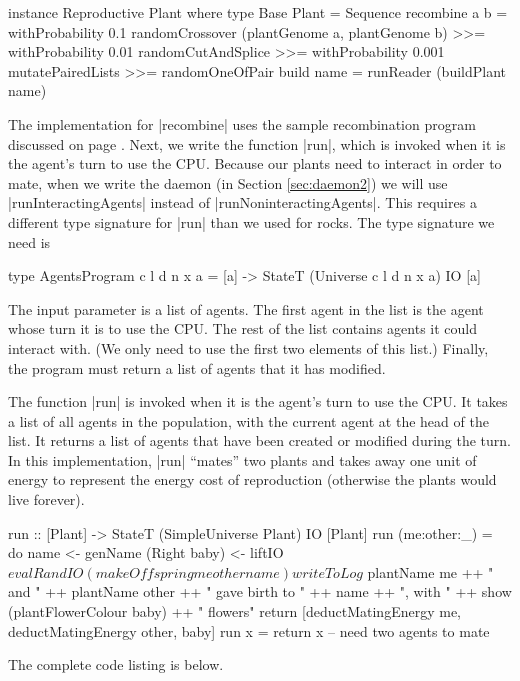 \begin{code}
instance Reproductive Plant where
  type Base Plant = Sequence
  recombine a b = 
    withProbability 0.1 randomCrossover (plantGenome a, plantGenome b) >>=
    withProbability 0.01 randomCutAndSplice >>=
    withProbability 0.001 mutatePairedLists >>=
    randomOneOfPair
  build name = runReader (buildPlant name)
\end{code} 

The implementation for |recombine| uses the sample recombination
program discussed on page \pageref{code:recombination}.
Next, we write the function |run|, 
which is invoked when it is the agent's turn to use the CPU.
Because our plants need to interact in order to mate,
when we write the daemon (in Section \ref{sec:daemon2}) we will use
|runInteractingAgents| instead of |runNoninteractingAgents|.
This requires a different type signature for |run| than we used for
rocks.
The type signature we need is

\begin{code}
type AgentsProgram c l d n x a = 
  [a] -> StateT (Universe c l d n x a) IO [a]
\end{code} 

The input parameter is a list of agents. 
The first agent in the list is the agent whose turn it is to use the 
CPU.
The rest of the list contains agents it could interact with.
(We only need to use the first two elements of this list.)
Finally, the program must return a list of agents that it has modified.

The function |run| is invoked when it is the agent's turn to use the CPU.
It takes a list of all agents in the population, with the current agent at the head of the list.
It returns a list of agents that have been created or modified during the turn.
In this implementation, |run| ``mates'' two plants and takes away one unit of energy 
to represent the energy cost of reproduction
(otherwise the plants would live forever).

\begin{code}
run :: [Plant] -> StateT (SimpleUniverse Plant) IO [Plant]
run (me:other:_) = do
  name <- genName
  (Right baby) <- liftIO $ evalRandIO (makeOffspring me other name)
  writeToLog $ 
    plantName me ++ " and " ++ plantName other ++
      " gave birth to " ++ name ++ ", with " ++ 
       show (plantFlowerColour baby) ++ " flowers"
  return [deductMatingEnergy me, deductMatingEnergy other, baby]
run x = return x -- need two agents to mate
\end{code}

The complete code listing is below.
\label{code:plant}

